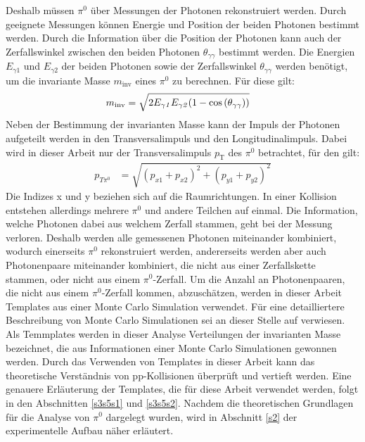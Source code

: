 Deshalb müssen $\pi^{0}$ über Messungen der Photonen rekonstruiert werden.
Durch geeignete Messungen können Energie und Position der beiden Photonen bestimmt werden.
Durch die Information über die Position der Photonen kann auch der Zerfallswinkel zwischen den beiden Photonen $\theta_{\gamma\gamma}$ bestimmt werden.
Die Energien $E_{\gamma1}$ und $E_{\gamma2}$ der beiden Photonen sowie der Zerfallswinkel $\theta_{\gamma\gamma}$ werden benötigt, um die invariante Masse $m_{\text{inv}}$ eines $\pi^{0}$ zu berechnen.
Für diese gilt:
\begin{align}
m_{\text{inv}} &= \sqrt{2E_{\gamma\it{1}}E_{\gamma\it{2}}(1-\cos\left( \theta_{\gamma\gamma}\right) )} \label{eq_invmass}
\end{align}
\newline
Neben der Bestimmung der invarianten Masse kann der Impuls der Photonen aufgeteilt werden in den Transversalimpuls und den Longitudinalimpuls.
Dabei wird in dieser Arbeit nur der Transversalimpuls $p_\text{T}$ des $\pi^{0}$ betrachtet, für den gilt:
\begin{align}
p_{T\pi^{0}} &= \sqrt{\left(p_{x1}+p_{x2}\right)^{2} +\left(p_{y1}+p_{y2}\right)^{2}} \label{eq_pt}
\end{align}
Die Indizes x und y beziehen sich auf die Raumrichtungen.
\newpage
\noindent
In einer Kollision entstehen allerdings mehrere $\pi^{0}$ und andere Teilchen auf einmal.
Die Information, welche Photonen dabei aus welchem Zerfall stammen, geht bei der Messung verloren.
Deshalb werden alle gemessenen Photonen miteinander kombiniert, wodurch einerseits $\pi^{0}$ rekonstruiert werden, andererseits werden aber auch Photonenpaare miteinander kombiniert, die nicht aus einer Zerfallskette stammen, oder nicht aus einem $\pi^{0}$-Zerfall.
Um die Anzahl an Photonenpaaren, die nicht aus einem $\pi^{0}$-Zerfall kommen, abzuschätzen, werden in dieser Arbeit  Templates aus einer Monte Carlo Simulation verwendet.
Für eine detailliertere Beschreibung von Monte Carlo Simulationen sei an dieser Stelle auf \cite{thesis:Krissy} verwiesen.
Als Temmplates werden in dieser Analyse Verteilungen der invarianten Masse bezeichnet, die aus Informationen einer Monte Carlo Simulationen gewonnen werden. 
Durch das Verwenden von Templates in dieser Arbeit kann das theoretische Verständnis von pp-Kollisionen überprüft und vertieft werden.
Eine genauere Erläuterung der Templates, die für diese Arbeit verwendet werden, folgt in den Abschnitten \ref{s3s5s1} und \ref{s3s5s2}.
\newline
Nachdem die theoretischen Grundlagen für die Analyse von $\pi^{0}$ dargelegt wurden, wird in Abschnitt \ref{s2} der experimentelle Aufbau näher erläutert.